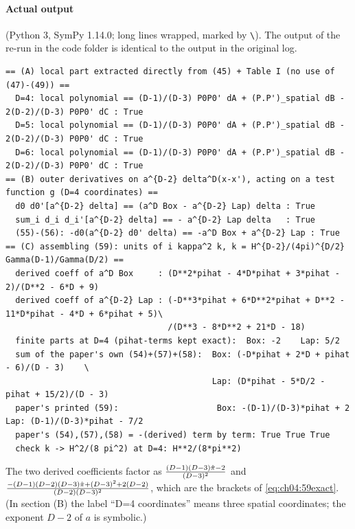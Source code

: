 \paragraph{Actual output} (Python 3, SymPy 1.14.0; long lines wrapped, marked by \texttt{\textbackslash}).
The output of the re-run in the code folder is identical to the output in the original log.
{\scriptsize
\begin{verbatim}
== (A) local part extracted directly from (45) + Table I (no use of (47)-(49)) ==
  D=4: local polynomial == (D-1)/(D-3) P0P0' dA + (P.P')_spatial dB - 2(D-2)/(D-3) P0P0' dC : True
  D=5: local polynomial == (D-1)/(D-3) P0P0' dA + (P.P')_spatial dB - 2(D-2)/(D-3) P0P0' dC : True
  D=6: local polynomial == (D-1)/(D-3) P0P0' dA + (P.P')_spatial dB - 2(D-2)/(D-3) P0P0' dC : True
== (B) outer derivatives on a^{D-2} delta^D(x-x'), acting on a test function g (D=4 coordinates) ==
  d0 d0'[a^{D-2} delta] == (a^D Box - a^{D-2} Lap) delta : True
  sum_i d_i d_i'[a^{D-2} delta] == - a^{D-2} Lap delta   : True
  (55)-(56): -d0(a^{D-2} d0' delta) == -a^D Box + a^{D-2} Lap : True
== (C) assembling (59): units of i kappa^2 k, k = H^{D-2}/(4pi)^{D/2} Gamma(D-1)/Gamma(D/2) ==
  derived coeff of a^D Box     : (D**2*pihat - 4*D*pihat + 3*pihat - 2)/(D**2 - 6*D + 9)
  derived coeff of a^{D-2} Lap : (-D**3*pihat + 6*D**2*pihat + D**2 - 11*D*pihat - 4*D + 6*pihat + 5)\
                                 /(D**3 - 8*D**2 + 21*D - 18)
  finite parts at D=4 (pihat-terms kept exact):  Box: -2    Lap: 5/2
  sum of the paper's own (54)+(57)+(58):  Box: (-D*pihat + 2*D + pihat - 6)/(D - 3)    \
                                          Lap: (D*pihat - 5*D/2 - pihat + 15/2)/(D - 3)
  paper's printed (59):                    Box: -(D-1)/(D-3)*pihat + 2   Lap: (D-1)/(D-3)*pihat - 7/2
  paper's (54),(57),(58) = -(derived) term by term: True True True
  check k -> H^2/(8 pi^2) at D=4: H**2/(8*pi**2)
\end{verbatim}
}
\noindent
The two derived coefficients factor as $\frac{(D-1)(D-3)\hat\pi-2}{(D-3)^2}$ and
$\frac{-(D-1)(D-2)(D-3)\hat\pi+(D-3)^2+2(D-2)}{(D-2)(D-3)^2}$, which are the brackets of \eqref{eq:ch04:59exact}.
(In section (B) the label ``D=4 coordinates'' means three spatial coordinates; the exponent $D-2$ of $a$ is symbolic.)

